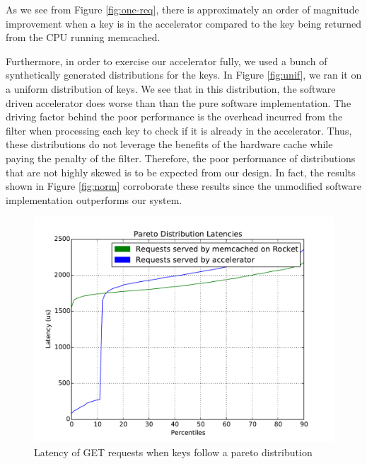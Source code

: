 As we see from Figure \ref{fig:one-req}, there is approximately an order of magnitude
improvement when a key is in the accelerator compared to the key being returned
from the CPU running memcached.

Furthermore, in order to exercise our accelerator fully, we used a bunch of
synthetically generated distributions for the keys. In Figure \ref{fig:unif},
we ran it on a uniform distribution of keys. We see that in this distribution,
the software driven accelerator does worse than than the pure software
implementation. The driving factor behind the poor performance is the overhead
incurred from the filter when processing each key to check if it is already in
the accelerator. Thus, these distributions do not leverage the benefits of the
hardware cache while paying the penalty of the filter. Therefore, the poor
performance of distributions that are not highly skewed is to be expected from
our design. In fact, the results shown in Figure \ref{fig:norm} corroborate
these results since the unmodified software implementation outperforms our
system.

\begin{figure}[t]
\begin{center}
\includegraphics[width=\linewidth]{pareto.pdf}
\caption{Latency of GET requests when keys follow a pareto distribution}
\label{fig:pareto}
\end{center}
\end{figure}


